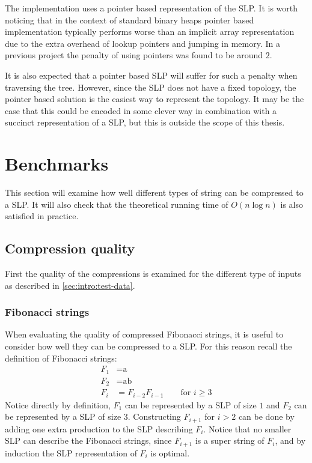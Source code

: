 \documentclass[twoside,11pt,openright]{report}
\begin{document}
The implementation uses a pointer based representation of the SLP. It is worth noticing that in the context of standard binary heaps pointer based implementation typically performs worse than an implicit array representation due to the extra overhead of lookup pointers and jumping in memory. In a previous project \cite[p. 9]{AA13Project1} the penalty of using pointers was found to be around $2$.

It is also expected that a pointer based SLP will suffer for such a penalty when traversing the tree. However, since the SLP does not have a fixed topology, the pointer based solution is the easiest way to represent the topology. It may be the case that this could be encoded in some clever way in combination with a succinct representation of a SLP, but this is outside the scope of this thesis.

\clearpage
\section{Benchmarks}
\label{sec:compression:benchmarks}
This section will examine how well different types of string can be compressed to a SLP. It will also check that the theoretical running time of $O(n\log{n})$ is also satisfied in practice.

\subsection{Compression quality}
First the quality of the compressions is examined for the different type of inputs as described in \cref{sec:intro:test-data}.

\subsubsection{Fibonacci strings}
\label{sec:compressing-Fibonacci-strings}
When evaluating the quality of compressed Fibonacci strings, it is useful to consider how well they can be compressed to a SLP. For this reason recall the definition of Fibonacci strings:
\begin{align*}
  F_1 &= \text{a} \\
  F_2 &= \text{ab} \\
  F_{i} &= F_{i - 2} F_{i - 1} \quad\quad \text{for } i \geq 3
\end{align*}
Notice directly by definition, $F_1$ can be represented by a SLP of size $1$ and $F_2$ can be represented by a SLP of size $3$. Constructing $F_{i + 1}$ for $i > 2$ can be done by adding one extra production to the SLP describing $F_{i}$. Notice that no smaller SLP can describe the Fibonacci strings, since $F_{i+1}$ is a super string of $F_i$, and by induction the SLP representation of $F_i$ is optimal.
\end{document}
